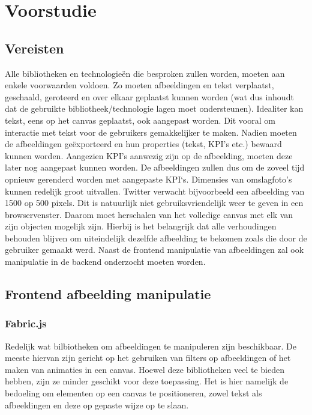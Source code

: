 
\chapter{Voorstudie}
\vspace{-3cm}
\section{Vereisten} \label{vereisten}
Alle bibliotheken en technologie\"{e}n die besproken zullen worden, moeten aan enkele voorwaarden voldoen. Zo moeten afbeeldingen en tekst verplaatst, geschaald, geroteerd en over elkaar geplaatst kunnen worden (wat dus inhoudt dat de gebruikte bibliotheek/technologie lagen moet ondersteunen). Idealiter kan tekst, eens op het canvas geplaatst, ook aangepast worden. Dit vooral om interactie met tekst voor de gebruikers gemakkelijker te maken. Nadien moeten de afbeeldingen ge\"{e}xporteerd en hun properties (tekst, KPI's etc.) bewaard kunnen worden. Aangezien KPI's aanwezig zijn op de afbeelding, moeten deze later nog aangepast kunnen worden. De afbeeldingen zullen dus om de zoveel tijd opnieuw gerenderd worden met aangepaste KPI`s. Dimensies van omslagfoto's kunnen redelijk groot uitvallen. Twitter verwacht bijvoorbeeld een afbeelding van 1500 op 500 pixels. Dit is natuurlijk niet gebruiksvriendelijk weer te geven in een browservenster. Daarom moet herschalen van het volledige canvas met elk van zijn objecten mogelijk zijn. Hierbij is het belangrijk dat alle verhoudingen behouden blijven om uiteindelijk dezelfde afbeelding te bekomen zoals die door de gebruiker gemaakt werd. Naast de frontend manipulatie van afbeeldingen zal ook manipulatie in de backend onderzocht moeten worden.  

\section{Frontend afbeelding manipulatie}
\subsection{Fabric.js}
Redelijk wat bilbiotheken om afbeeldingen te manipuleren zijn beschikbaar. De meeste hiervan zijn gericht op het gebruiken van filters op afbeeldingen of het maken van animaties in een canvas. Hoewel deze bibliotheken veel te bieden hebben, zijn ze minder geschikt voor deze toepassing. Het is hier namelijk de bedoeling om elementen op een canvas te positioneren, zowel tekst als afbeeldingen en deze op gepaste wijze op te slaan. 

